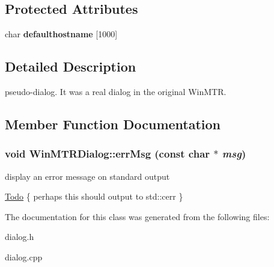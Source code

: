 \subsection*{Protected Attributes}
\begin{CompactItemize}
\item 
\hypertarget{classWinMTRDialog_22740cfd271e0cdd60b0b208e6d0f679}{
char \textbf{defaulthostname} \mbox{[}1000\mbox{]}}
\label{classWinMTRDialog_22740cfd271e0cdd60b0b208e6d0f679}

\end{CompactItemize}


\subsection{Detailed Description}
pseudo-dialog. It was a real dialog in the original WinMTR. 

\subsection{Member Function Documentation}
\hypertarget{classWinMTRDialog_b7ff762dde134250e3b713d8d56904ae}{
\subsubsection[errMsg]{\setlength{\rightskip}{0pt plus 5cm}void WinMTRDialog::errMsg (const char $\ast$ {\em msg})}}
\label{classWinMTRDialog_b7ff762dde134250e3b713d8d56904ae}


display an error message on standard output 

\begin{Desc}
\item[\hyperlink{todo__todo000001}{Todo}]\{ perhaps this should output to std::cerr \} \end{Desc}


The documentation for this class was generated from the following files:\begin{CompactItemize}
\item 
dialog.h\item 
dialog.cpp\end{CompactItemize}
